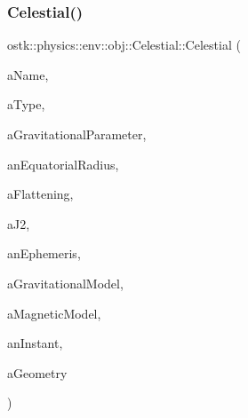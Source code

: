 \subsubsection{\texorpdfstring{Celestial()}{Celestial()}\hspace{0.1cm}{\footnotesize\ttfamily [2/2]}}
{\footnotesize\ttfamily ostk\+::physics\+::env\+::obj\+::\+Celestial\+::\+Celestial (\begin{DoxyParamCaption}\item[{const String \&}]{a\+Name,  }\item[{const \hyperlink{classostk_1_1physics_1_1env_1_1obj_1_1_celestial_aa0711d887522b35b2b3630156d912779}{Celestial\+::\+Type} \&}]{a\+Type,  }\item[{const \hyperlink{classostk_1_1physics_1_1units_1_1_derived}{Derived} \&}]{a\+Gravitational\+Parameter,  }\item[{const \hyperlink{classostk_1_1physics_1_1units_1_1_length}{Length} \&}]{an\+Equatorial\+Radius,  }\item[{const Real \&}]{a\+Flattening,  }\item[{const Real \&}]{a\+J2,  }\item[{const Shared$<$ \hyperlink{classostk_1_1physics_1_1env_1_1_ephemeris}{Ephemeris} $>$ \&}]{an\+Ephemeris,  }\item[{const Shared$<$ \hyperlink{namespaceostk_1_1physics_1_1env_1_1obj_a50c0bc72e8880f2fa2a910a81e050c97}{Gravitational\+Model} $>$ \&}]{a\+Gravitational\+Model,  }\item[{const Shared$<$ \hyperlink{namespaceostk_1_1physics_1_1env_1_1obj_a11552c1290e2f6b4693ea00c2df2c80d}{Magnetic\+Model} $>$ \&}]{a\+Magnetic\+Model,  }\item[{const \hyperlink{classostk_1_1physics_1_1time_1_1_instant}{Instant} \&}]{an\+Instant,  }\item[{const \hyperlink{classostk_1_1physics_1_1env_1_1_object_a66e44a65aefb23a184a6de531e96935d}{Object\+::\+Geometry} \&}]{a\+Geometry }\end{DoxyParamCaption})}

\mbox{\label{classostk_1_1physics_1_1env_1_1obj_1_1_celestial_aadbeb101aaa4c4acb136278385d2080b}} 
